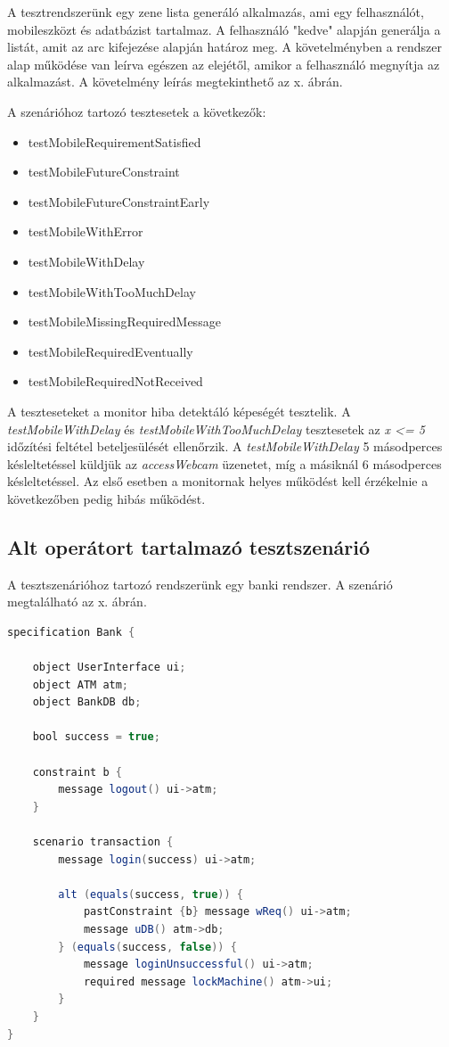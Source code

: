 A tesztrendszerünk egy zene lista generáló alkalmazás, ami egy felhasználót, mobileszközt és adatbázist tartalmaz.
A felhasználó "kedve" alapján generálja a listát, amit az arc kifejezése alapján határoz meg.
A követelményben a rendszer alap működése van leírva egészen az elejétől, amikor a felhasználó megnyítja az alkalmazást.
A követelmény leírás megtekinthető az x. ábrán.

A szenárióhoz tartozó tesztesetek a következők:

\begin{itemize}
    \item testMobileRequirementSatisfied
    \item testMobileFutureConstraint
    \item testMobileFutureConstraintEarly
    \item testMobileWithError
    \item testMobileWithDelay
    \item testMobileWithTooMuchDelay
    \item testMobileMissingRequiredMessage
    \item testMobileRequiredEventually
    \item testMobileRequiredNotReceived
\end{itemize}

A teszteseteket a monitor hiba detektáló képeségét tesztelik.
A \textit{testMobileWithDelay} és \textit{testMobileWithTooMuchDelay} tesztesetek az \textit{x <= 5} időzítési feltétel beteljesülését ellenőrzik.
A \textit{testMobileWithDelay} 5 másodperces késleltetéssel küldjük az \textit{accessWebcam} üzenetet, míg a másiknál 6 másodperces késleltetéssel.
Az első esetben a monitornak helyes működést kell érzékelnie a következőben pedig hibás működést.

\clearpage\subsection{Alt operátort tartalmazó tesztszenárió}

A tesztszenárióhoz tartozó rendszerünk egy banki rendszer.
A szenárió megtalálható az x. ábrán.

\begin{lstlisting}[language=java, frame=single, float=ht!, caption={Integrációs teszteset.},captionpos=b]
specification Bank {

    object UserInterface ui;
    object ATM atm;
    object BankDB db;

    bool success = true;

    constraint b {
        message logout() ui->atm;
    }

    scenario transaction {
        message login(success) ui->atm;

        alt (equals(success, true)) {
            pastConstraint {b} message wReq() ui->atm;
            message uDB() atm->db;
        } (equals(success, false)) {
            message loginUnsuccessful() ui->atm;
            required message lockMachine() atm->ui;
        }
    }
}
\end{lstlisting}

